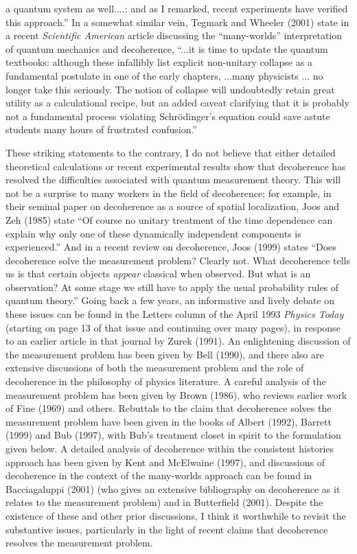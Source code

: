 a quantum system as well....; and as I remarked, recent experiments have 
verified this approach.''  In a somewhat similar vein, Tegmark and Wheeler 
(2001) 
state in a recent {\it Scientific American} 
article discussing the ``many-worlds'' interpretation of quantum mechanics 
and decoherence, ``...it is time to update 
the quantum textbooks: although these infallibly list explicit non-unitary 
collapse as a fundamental postulate in one of the early chapters, ...many 
physicists ... no longer take this seriously.  The notion of collapse will 
undoubtedly retain great utility as a calculational recipe, but an added 
caveat clarifying that it is probably not a fundamental process violating 
Schr\"odinger's equation could save astute students many hours of frustrated 
confusion.''

These striking statements to the contrary, I do not believe that 
either detailed theoretical calculations or recent  
experimental results show that decoherence has 
resolved the difficulties associated with   
quantum measurement theory.  This will not be a surprise to 
many workers in the field of 
decoherence; for example, in their seminal paper on 
decoherence as a source 
of spatial localization, Joos and Zeh (1985) state 
``Of course no unitary treatment 
of the time dependence can explain why only one of these dynamically 
independent components is experienced.''  And in a recent review on 
decoherence,  Joos (1999) 
states ``Does decoherence solve the measurement problem?  Clearly not.  
What decoherence tells us is that certain objects {\it appear} classical 
when observed.  But what is an observation?  At some stage we still have to 
apply the usual probability rules of quantum theory.''  Going back a few 
years, an informative 
and lively debate on these issues can be found in the Letters column of 
the April 1993 {\it Physics Today} (starting on page 13 of that issue and 
continuing over many pages), in response to an earlier article in that 
journal by Zurek (1991). An enlightening discussion of the measurement 
problem has been given by Bell (1990), and there also are extensive discussions of both 
the measurement problem and the role of decoherence in the philosophy of 
physics literature.  A careful analysis of the measurement problem has 
been given by Brown (1986), who reviews earlier work of Fine (1969) 
and others.   Rebuttals to the claim that decoherence solves the measurement 
problem have been given in the books of Albert (1992), Barrett (1999) and 
Bub (1997), with Bub's treatment closet in spirit to the formulation given 
below.  A detailed analysis of decoherence within the consistent histories 
approach has been given by  Kent and McElwaine (1997), and 
 discussions of  decoherence in the context of the many-worlds approach  
  can be found in Bacciagaluppi (2001)
 (who  gives  an extensive bibliography on decoherence 
as it relates to the measurement problem) and in Butterfield (2001).   
Despite the existence of these and other prior  
discussions, I think it worthwhile to revisit the substantive issues, 
particularly in the light of recent claims that decoherence resolves  
the measurement problem.  

